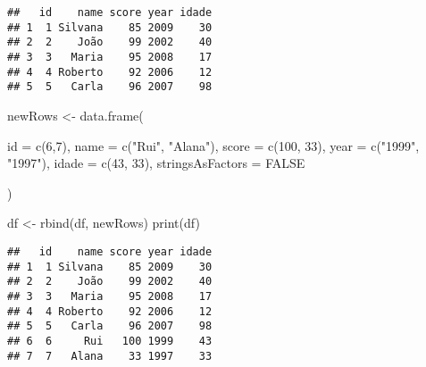 \documentclass[
]{article}
\newenvironment{Shaded}{\begin{snugshade}}{\end{snugshade}}
\newcommand{\AttributeTok}[1]{\textcolor[rgb]{0.77,0.63,0.00}{#1}}
\newcommand{\ConstantTok}[1]{\textcolor[rgb]{0.00,0.00,0.00}{#1}}
\newcommand{\DecValTok}[1]{\textcolor[rgb]{0.00,0.00,0.81}{#1}}
\newcommand{\FunctionTok}[1]{\textcolor[rgb]{0.00,0.00,0.00}{#1}}
\newcommand{\NormalTok}[1]{#1}
\newcommand{\OtherTok}[1]{\textcolor[rgb]{0.56,0.35,0.01}{#1}}
\newcommand{\SpecialCharTok}[1]{\textcolor[rgb]{0.00,0.00,0.00}{#1}}
\newcommand{\StringTok}[1]{\textcolor[rgb]{0.31,0.60,0.02}{#1}}
\begin{document}
\begin{Shaded}
\end{Shaded}

\begin{verbatim}
##   id    name score year idade
## 1  1 Silvana    85 2009    30
## 2  2    João    99 2002    40
## 3  3   Maria    95 2008    17
## 4  4 Roberto    92 2006    12
## 5  5   Carla    96 2007    98
\end{verbatim}

\begin{Shaded}
\begin{Highlighting}[]
\NormalTok{newRows }\OtherTok{\textless{}{-}} \FunctionTok{data.frame}\NormalTok{(}
  
  \AttributeTok{id =} \FunctionTok{c}\NormalTok{(}\DecValTok{6}\NormalTok{,}\DecValTok{7}\NormalTok{),}
  \AttributeTok{name =} \FunctionTok{c}\NormalTok{(}\StringTok{"Rui"}\NormalTok{, }\StringTok{"Alana"}\NormalTok{),}
  \AttributeTok{score =} \FunctionTok{c}\NormalTok{(}\DecValTok{100}\NormalTok{, }\DecValTok{33}\NormalTok{),}
  \AttributeTok{year =} \FunctionTok{c}\NormalTok{(}\StringTok{"1999"}\NormalTok{, }\StringTok{"1997"}\NormalTok{),}
  \AttributeTok{idade =} \FunctionTok{c}\NormalTok{(}\DecValTok{43}\NormalTok{, }\DecValTok{33}\NormalTok{),}
  \AttributeTok{stringsAsFactors =} \ConstantTok{FALSE}
  
\NormalTok{)}

\NormalTok{df }\OtherTok{\textless{}{-}} \FunctionTok{rbind}\NormalTok{(df, newRows)}
\FunctionTok{print}\NormalTok{(df)}
\end{Highlighting}
\end{Shaded}

\begin{verbatim}
##   id    name score year idade
## 1  1 Silvana    85 2009    30
## 2  2    João    99 2002    40
## 3  3   Maria    95 2008    17
## 4  4 Roberto    92 2006    12
## 5  5   Carla    96 2007    98
## 6  6     Rui   100 1999    43
## 7  7   Alana    33 1997    33
\end{verbatim}
\end{document}
